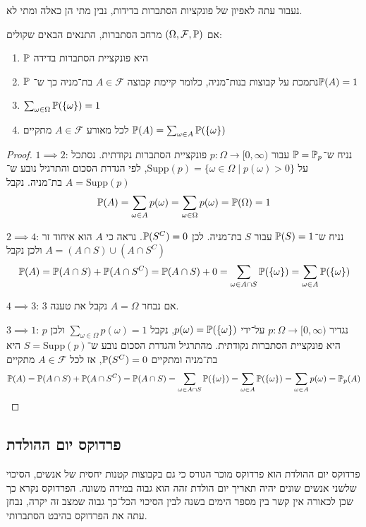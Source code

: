 נעבור עתה לאפיון של פונקציות הסתברות בדידות, נבין מתי הן כאלה ומתי לא.
\begin{theorem}
	אם $(\Omega, \mathcal{F}, \mathbb{P})$ מרחב הסתברות, התנאים הבאים שקולים:
	\begin{enumerate}
		\item $\mathbb{P}$ היא פונקציית הסתברות בדידה
		\item $\mathbb{P}$ נתמכת על קבוצות בנות־מניה, כלומר קיימת קבוצה $A \in \mathcal{F}$ בת־מניה כך ש־$\mathbb{P}(A) = 1$
		\item $\sum_{\omega \in \Omega} \mathbb{P}(\{\omega\}) = 1$
		\item לכל מאורע $A \in \mathcal{F}$ מתקיים $\mathbb{P}(A) = \sum_{\omega \in A} \mathbb{P}(\{\omega\})$
	\end{enumerate}
\end{theorem}
\begin{proof}
	$1 \implies 2$:
	נניח ש־$\mathbb{P} = \mathbb{P}_p$ עבור $p : \Omega \to [0, \infty)$ פונקציית הסתברות נקודתית.
	נסתכל על $\text{Supp}(p) = \{ \omega \in \Omega \mid p(\omega) > 0 \}$, לפי הגדרת הסכום והתרגיל נובע ש־$A = \text{Supp}(p)$ בת־מניה.
	נקבל
	\[
		\mathbb{P}(A) = \sum_{\omega \in A} p(\omega) = \sum_{\omega \in \Omega} p(\omega) = \mathbb{P}(\Omega) = 1
	\]

	$2 \implies 4$:
	נניח ש־$\mathbb{P}(S) = 1$ עבור $S$ בת־מניה. לכן $\mathbb{P}(S^C) = 0$.
	נראה כי $A$ הוא איחוד זר $A = (A \cap S) \cup (A \cap S^C)$ ולכן נקבל
	\[
		\mathbb{P}(A) = \mathbb{P}(A \cap S) + \mathbb{P}(A \cap S^C) = \mathbb{P}(A \cap S) + 0 = \sum_{\omega \in A \cap S} \mathbb{P}(\{\omega\}) = \sum_{\omega \in A} \mathbb{P}(\{\omega\})
	\]

	$4 \implies 3$:
	אם נבחר $A = \Omega$ נקבל את טענה 3.

	$3 \implies 1$:
	נגדיר $p : \Omega \to [0, \infty)$ על־ידי $p(\omega) = \mathbb{P}(\{ \omega \})$, נקבל $\sum_{\omega \in \Omega} p(\omega) = 1$ ולכן $p$ היא פונקציית הסתברות נקודתית.
	מהתרגיל והגדרת הסכום נובע ש־$S = \text{Supp}(p)$ היא בת־מניה ומתקיים $\mathbb{P}(S^C) = 0$, אז לכל $A \in \mathcal{F}$ מתקיים
	\[
		\mathbb{P}(A) = \mathbb{P}(A \cap S) + \mathbb{P}(A \cap S^C) = \mathbb{P}(A \cap S) = \sum_{\omega \in A \cap S} \mathbb{P}(\{ \omega \}) = \sum_{\omega \in A} \mathbb{P}(\{\omega\}) = \sum_{\omega \in A} p(\omega) = \mathbb{P}_p(A)
	\]
\end{proof}

\subsection{פרדוקס יום ההולדת}
פרדוקס יום ההולדת הוא פרדוקס מוכר הגורס כי גם בקבוצות קטנות יחסית של אנשים, הסיכוי שלשני אנשים שונים יהיה תאריך יום הולדת זהה הוא גבוה במידה משונה.
הפרדוקס נקרא כך שכן לכאורה אין קשר בין מספר הימים בשנה לבין הסיכוי הכל־כך גבוה שמצב זה יקרה, נבחן עתה את הפרדוקס בהיבט הסתברותי.

